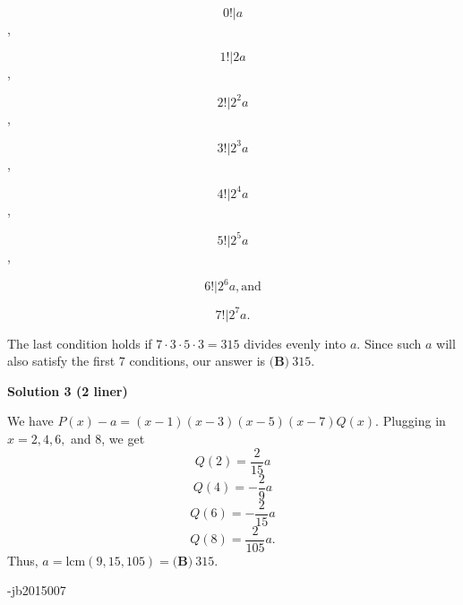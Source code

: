 \begin{enumerate}
 
 \[0! | a\],

 
 \[1! | 2a\],

 
 \[2! | 2^2 a\],

 
 \[3! | 2^3 a\],

 
 \[4! | 2^4 a\],

 
 \[5! | 2^5 a\],

 
 \[6! | 2^6 a, \text{and}\]

 \[7! | 2^7 a.\]

 The last condition holds if $7 \cdot 3 \cdot 5 \cdot 3 = 315$ divides evenly into $a$.  Since such $a$ will also satisfy the first $7$ conditions, our answer is $\boxed{\textbf{(B)}\ 315}$.

 



\textbf{Solution 3 (2 liner)}

We have $P(x)-a=(x-1)(x-3)(x-5)(x-7)Q(x).$ Plugging in $x=2,4,6,$ and $8$, we get
 \[Q(2)=\dfrac{2}{15}a\]
 \[Q(4)=-\dfrac{2}{9}a\]
 \[Q(6)=-\dfrac{2}{15}a\]
 \[Q(8)=\dfrac{2}{105}a.\]Thus, $a=\text{lcm}(9,15,105)=\boxed{\textbf{(B)}\ 315}.$

 -jb2015007

 


\end{enumerate}
